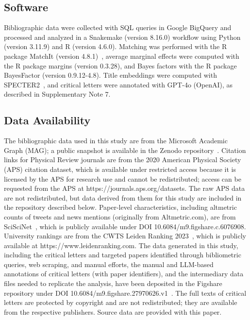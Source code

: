 \documentclass[12pt,a4paper]{article}
\numberwithin{equation}{section}
\begin{document}
%
%
%
%
\subsection*{Software}
Bibliographic data were collected with SQL queries in Google BigQuery and processed and analyzed in a Snakemake (version 8.16.0) workflow using Python (version 3.11.9) and R (version 4.6.0).
Matching was performed with the R package MatchIt (version 4.8.1)~\cite{matchit_2011}, average marginal effects were computed with the R package margins (version 0.3.28), and Bayes factors with the R package BayesFactor (version 0.9.12-4.8).
Title embeddings were computed with SPECTER2~\cite{Singh2022SciRepEvalAM}, and critical letters were annotated with GPT-4o (OpenAI), as described in Supplementary Note 7.

\subsection*{Data Availability}
The bibliographic data used in this study are from the Microsoft Academic Graph (MAG); a public snapshot is available in the Zenodo repository~\cite{mag_zenodo}.
Citation links for Physical Review journals are from the 2020 American Physical Society (APS) citation dataset, which is available under restricted access because it is licensed by the APS for research use and cannot be redistributed; access can be requested from the APS at https://journals.aps.org/datasets. The raw APS data are not redistributed, but data derived from them for this study are included in the repository described below.
Paper-level characteristics, including altmetric counts of tweets and news mentions (originally from Altmetric.com), are from SciSciNet~\cite{lin_2023_sciscinet}, which is publicly available under DOI 10.6084/m9.figshare.c.6076908.
University rankings are from the CWTS Leiden Ranking 2023~\cite{van_eck_2023_leiden}, which is publicly available at https://www.leidenranking.com.
The data generated in this study, including the critical letters and targeted papers identified through bibliometric queries, web scraping, and manual efforts, the manual and LLM-based annotations of critical letters (with paper identifiers), and the intermediary data files needed to replicate the analysis, have been deposited in the Figshare repository under DOI 10.6084/m9.figshare.27970626.v1~\cite{criticism_figshare}.
The full texts of critical letters are protected by copyright and are not redistributed; they are available from the respective publishers.
Source data are provided with this paper.
\end{document}
